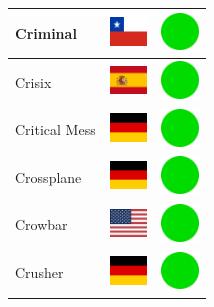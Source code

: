 \documentclass[12pt, a4paper, twoside]{report}
\begin{document}
\begin{center}
\begin{longtable}{|p{5cm}|p{2cm}|p{2cm}|}
Criminal & \includegraphics[width=1cm]{4x3/cl} & \includegraphics[width=1cm]{likes/y} \\ \hline
Crisix & \includegraphics[width=1cm]{4x3/es} & \includegraphics[width=1cm]{likes/y} \\ \hline
Critical Mess & \includegraphics[width=1cm]{4x3/de} & \includegraphics[width=1cm]{likes/y} \\ \hline
Crossplane & \includegraphics[width=1cm]{4x3/de} & \includegraphics[width=1cm]{likes/y} \\ \hline
Crowbar & \includegraphics[width=1cm]{4x3/us} & \includegraphics[width=1cm]{likes/y} \\ \hline
Crusher & \includegraphics[width=1cm]{4x3/de} & \includegraphics[width=1cm]{likes/y} \\ \hline

\end{longtable}
\end{center}
\end{document}
